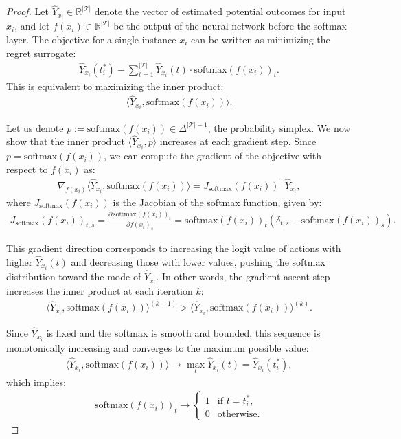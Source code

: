 \documentclass{article}
\theoremstyle{remark}
\begin{document}
\begin{proof}
Let $\hat{Y}_{x_i} \in \mathbb{R}^{|\mathcal{T}|}$ denote the vector of estimated potential outcomes for input $x_i$, and let $f(x_i) \in \mathbb{R}^{|\mathcal{T}|}$ be the output of the neural network before the softmax layer. The objective for a single instance $x_i$ can be written as minimizing the regret surrogate:
\begin{align}
    \hat{Y}_{x_i}(t^*_i) - \sum_{t=1}^{|\mathcal{T}|} \hat{Y}_{x_i}(t) \cdot \mathrm{softmax}(f(x_i))_t.
\end{align}
This is equivalent to maximizing the inner product:
\begin{align}
    \langle \hat{Y}_{x_i}, \mathrm{softmax}(f(x_i)) \rangle.
\end{align}

Let us denote $p := \mathrm{softmax}(f(x_i)) \in \Delta^{|\mathcal{T}| - 1}$, the probability simplex. We now show that the inner product $\langle \hat{Y}_{x_i}, p \rangle$ increases at each gradient step. Since $p = \mathrm{softmax}(f(x_i))$, we can compute the gradient of the objective with respect to $f(x_i)$ as:
\begin{align}
    \nabla_{f(x_i)} \langle \hat{Y}_{x_i}, \mathrm{softmax}(f(x_i)) \rangle
    = J_{\mathrm{softmax}}(f(x_i))^\top \hat{Y}_{x_i},
\end{align}
where $J_{\mathrm{softmax}}(f(x_i))$ is the Jacobian of the softmax function, given by:
\begin{align}
    J_{\mathrm{softmax}}(f(x_i))_{t,s} = \frac{\partial \, \mathrm{softmax}(f(x_i))_t}{\partial f(x_i)_s}
    = \mathrm{softmax}(f(x_i))_t \left(\delta_{t,s} - \mathrm{softmax}(f(x_i))_s \right).
\end{align}

This gradient direction corresponds to increasing the logit value of actions with higher $\hat{Y}_{x_i}(t)$ and decreasing those with lower values, pushing the softmax distribution toward the mode of $\hat{Y}_{x_i}$. In other words, the gradient ascent step increases the inner product at each iteration $k$:
\begin{align}
    \langle \hat{Y}_{x_i}, \mathrm{softmax}(f(x_i)) \rangle^{(k+1)} 
    > \langle \hat{Y}_{x_i}, \mathrm{softmax}(f(x_i)) \rangle^{(k)}.
\end{align}

Since $\hat{Y}_{x_i}$ is fixed and the softmax is smooth and bounded, this sequence is monotonically increasing and converges to the maximum possible value:
\begin{align}
    \langle \hat{Y}_{x_i}, \mathrm{softmax}(f(x_i)) \rangle \to \max_t \hat{Y}_{x_i}(t) = \hat{Y}_{x_i}(t^*_i),
\end{align}
which implies:
\begin{align}
    \mathrm{softmax}(f(x_i))_t \to 
    \begin{cases}
        1 & \text{if } t = t^*_i, \\
        0 & \text{otherwise}.
    \end{cases}
\end{align}


\end{proof}
\end{document}

